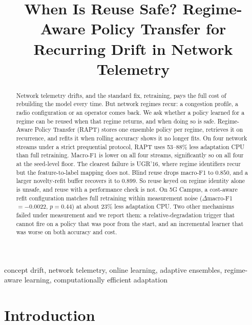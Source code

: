 \documentclass[conference]{IEEEtran}
\begin{document}
\title{When Is Reuse Safe? Regime-Aware Policy Transfer for Recurring Drift in Network Telemetry}


\author{
}


\maketitle


\begin{abstract}
Network telemetry drifts, and the standard fix, retraining, pays the full cost of
rebuilding the model every time. But network regimes recur: a congestion profile, a
radio configuration or an operator comes back. We ask whether a policy learned for a
regime can be reused when that regime returns, and when doing so is safe. Regime-Aware
Policy Transfer (RAPT) stores one ensemble policy per regime, retrieves it on
recurrence, and refits it when rolling accuracy shows it no longer fits. On four
network streams under a strict prequential protocol, RAPT uses 53--88\% less adaptation
CPU than full retraining. Macro-F1 is lower on all four streams, significantly so on
all four at the seed-level floor. The clearest failure is UGR'16, where regime
identifiers recur but the feature-to-label mapping does not. Blind reuse drops macro-F1
to $0.850$, and a larger novelty-refit buffer recovers it to $0.899$. So reuse
keyed on regime identity alone is unsafe, and reuse with a performance check is not. On
5G Campus, a cost-aware refit configuration matches full retraining within measurement
noise ($\Delta$macro-F1 $=-0.0022$, $p=0.44$) at about 23\% less adaptation CPU. Two
other mechanisms failed under measurement and we report them: a relative-degradation
trigger that cannot fire on a policy that was poor from the start, and an incremental
learner that was worse on both accuracy and cost.
\end{abstract}


\begin{IEEEkeywords}
concept drift, network telemetry, online learning, adaptive ensembles,
regime-aware learning, computationally efficient adaptation
\end{IEEEkeywords}


\section{Introduction}
\end{document}
